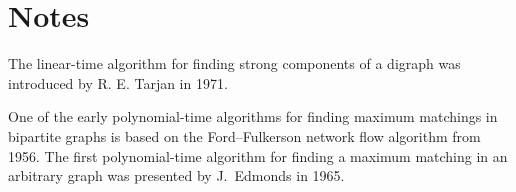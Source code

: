 \section{Notes}

The linear-time algorithm for finding strong components of a digraph was 
introduced by R. E. Tarjan in 1971.

One of the early polynomial-time algorithms for finding
maximum matchings in bipartite graphs is based on the Ford--Fulkerson 
network flow algorithm \cite{FF56} from 1956.
The first polynomial-time algorithm for finding a maximum matching in an 
arbitrary graph was presented by J.~Edmonds \cite{Ed65} in 1965.


